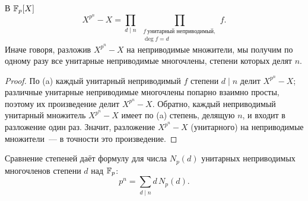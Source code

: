 \begin{center}
\begin{keepfig}
\centering
{}
\end{keepfig}
\end{center}

\begin{theorem}[4.22b]
В $\mathbb F_p[X]$
\[
X^{p^n}-X=\prod_{d\mid n}\ \prod_{\substack{f\ \text{унитарный неприводимый},\\ \deg f=d}}f .
\]
Иначе говоря, разложив $X^{p^n}-X$ на неприводимые множители, мы получим по одному разу все унитарные неприводимые
многочлены, степени которых делят $n$.
\end{theorem}

\begin{proof}
По (a) каждый унитарный неприводимый $f$ степени $d\mid n$ делит $X^{p^n}-X$; различные унитарные неприводимые
многочлены попарно взаимно просты, поэтому их произведение делит $X^{p^n}-X$. Обратно, каждый неприводимый унитарный
множитель $X^{p^n}-X$ имеет по (a) степень, делящую $n$, и входит в разложение один раз. Значит, разложение
$X^{p^n}-X$ (унитарного) на неприводимые множители~--- в точности это произведение.
\end{proof}

Сравнение степеней даёт формулу для числа $N_p(d)$ унитарных неприводимых многочленов степени $d$ над $\mathbb F_p$:
\begin{equation}\label{eq:c4-gauss}
p^n=\sum_{d\mid n}d\,N_p(d).
\end{equation}

